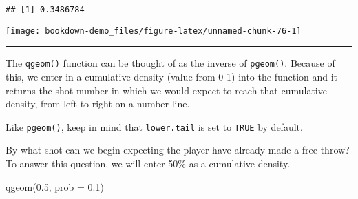 \documentclass[
]{book}
\newenvironment{Shaded}{\begin{snugshade}}{\end{snugshade}}
\newcommand{\AttributeTok}[1]{\textcolor[rgb]{0.77,0.63,0.00}{#1}}
\newcommand{\CommentTok}[1]{\textcolor[rgb]{0.56,0.35,0.01}{\textit{#1}}}
\newcommand{\DecValTok}[1]{\textcolor[rgb]{0.00,0.00,0.81}{#1}}
\newcommand{\FloatTok}[1]{\textcolor[rgb]{0.00,0.00,0.81}{#1}}
\newcommand{\FunctionTok}[1]{\textcolor[rgb]{0.00,0.00,0.00}{#1}}
\newcommand{\NormalTok}[1]{#1}
\newcommand{\SpecialCharTok}[1]{\textcolor[rgb]{0.00,0.00,0.00}{#1}}
\newcommand{\StringTok}[1]{\textcolor[rgb]{0.31,0.60,0.02}{#1}}
\begin{document}
\begin{verbatim}
## [1] 0.3486784
\end{verbatim}

\begin{Shaded}
\end{Shaded}

\begin{center}\texttt{[image: bookdown-demo\_files/figure-latex/unnamed-chunk-76-1]} \end{center}

\begin{center}\rule{0.5\linewidth}{0.5pt}\end{center}

The \texttt{qgeom()} function can be thought of as the inverse of \texttt{pgeom()}. Because of this, we enter in a cumulative density (value from 0-1) into the function and it returns the shot number in which we would expect to reach that cumulative density, from left to right on a number line.

Like \texttt{pgeom()}, keep in mind that \texttt{lower.tail} is set to \texttt{TRUE} by default.

By what shot can we begin expecting the player have already made a free throw? To answer this question, we will enter 50\% as a cumulative density.

\begin{Shaded}
\begin{Highlighting}[]
\FunctionTok{qgeom}\NormalTok{(}\FloatTok{0.5}\NormalTok{, }\AttributeTok{prob =} \FloatTok{0.1}\NormalTok{)}
\end{Highlighting}
\end{Shaded}
\end{document}
